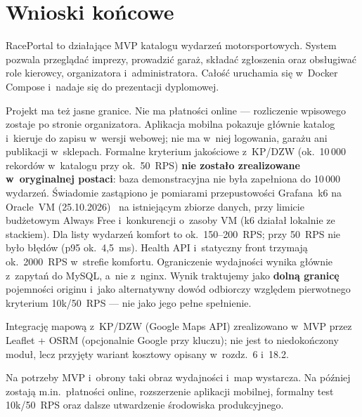 \documentclass{sprz}
\begin{document}
\section{Wnioski końcowe}
\label{sec:wnioski-koncowe}
RacePortal to działające MVP katalogu wydarzeń motorsportowych.
System pozwala przeglądać imprezy, prowadzić garaż, składać zgłoszenia
oraz obsługiwać role kierowcy, organizatora i~administratora.
Całość uruchamia się w~Docker Compose i~nadaje się do prezentacji dyplomowej.

Projekt ma też jasne granice.
Nie ma płatności online --- rozliczenie wpisowego zostaje po stronie organizatora.
Aplikacja mobilna pokazuje głównie katalog i~kieruje do zapisu w~wersji webowej;
nie ma w~niej logowania, garażu ani publikacji w~sklepach.
Formalne kryterium jakościowe z~KP/DZW (ok.\ 10\,000 rekordów w~katalogu przy ok.\ 50~RPS)
\textbf{nie zostało zrealizowane w~oryginalnej postaci}: baza demonstracyjna nie była
zapełniona do 10\,000 wydarzeń. Świadomie zastąpiono je pomiarami przepustowości
Grafana~k6 na Oracle~VM (25.10.2026)~\cite{k6:vm-rps} na istniejącym zbiorze danych,
przy limicie budżetowym Always Free i~konkurencji o~zasoby VM (k6 działał lokalnie
ze stackiem). Dla listy wydarzeń komfort to ok.\ 150--200~RPS; przy 50~RPS nie było błędów
(p95 ok.\ 4{,}5~ms). Health API i~statyczny front trzymają ok.\ 2000~RPS w~strefie komfortu.
Ograniczenie wydajności wynika głównie z~zapytań do MySQL, a~nie z~nginx.
Wynik traktujemy jako \textbf{dolną granicę} pojemności originu i~jako alternatywny
dowód odbiorczy względem pierwotnego kryterium 10k/50~RPS --- nie jako jego pełne spełnienie.

Integrację mapową z~KP/DZW (Google Maps API) zrealizowano w~MVP przez Leaflet + OSRM
(opcjonalnie Google przy kluczu); nie jest to niedokończony moduł, lecz przyjęty wariant
kosztowy opisany w~rozdz.~6 i~18.2.

Na potrzeby MVP i~obrony taki obraz wydajności i~map wystarcza.
Na później zostają m.in.\ płatności online, rozszerzenie aplikacji mobilnej,
formalny test 10k/50~RPS oraz dalsze utwardzenie środowiska produkcyjnego.


\printbibliography[title={Bibliografia}, heading=bibintoc]

\clearpage
{}
{}
\listoffigures

\clearpage
{}
{}
\listoftables

\makethesisattachments
\end{document}
